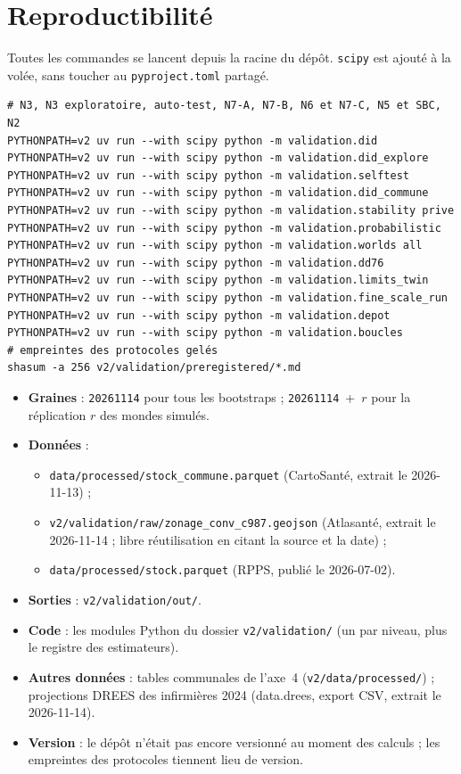\documentclass[11pt]{article}
\begin{document}
\section{Reproductibilité}\label{sec:repro}
Toutes les commandes se lancent depuis la racine du dépôt. \texttt{scipy} est ajouté à la volée,
sans toucher au \texttt{pyproject.toml} partagé.
\begin{verbatim}
# N3, N3 exploratoire, auto-test, N7-A, N7-B, N6 et N7-C, N5 et SBC, N2
PYTHONPATH=v2 uv run --with scipy python -m validation.did
PYTHONPATH=v2 uv run --with scipy python -m validation.did_explore
PYTHONPATH=v2 uv run --with scipy python -m validation.selftest
PYTHONPATH=v2 uv run --with scipy python -m validation.did_commune
PYTHONPATH=v2 uv run --with scipy python -m validation.stability prive
PYTHONPATH=v2 uv run --with scipy python -m validation.probabilistic
PYTHONPATH=v2 uv run --with scipy python -m validation.worlds all
PYTHONPATH=v2 uv run --with scipy python -m validation.dd76
PYTHONPATH=v2 uv run --with scipy python -m validation.limits_twin
PYTHONPATH=v2 uv run --with scipy python -m validation.fine_scale_run
PYTHONPATH=v2 uv run --with scipy python -m validation.depot
PYTHONPATH=v2 uv run --with scipy python -m validation.boucles
# empreintes des protocoles gelés
shasum -a 256 v2/validation/preregistered/*.md
\end{verbatim}
\begin{itemize}
  \item \textbf{Graines} : \texttt{20261114} pour tous les bootstraps ; \texttt{20261114}~+~$r$ pour
        la réplication $r$ des mondes simulés.
  \item \textbf{Données} :
        \begin{itemize}
          \item \texttt{data/processed/stock\_commune.parquet} (CartoSanté, extrait le 2026-11-13) ;
          \item \texttt{v2/validation/raw/zonage\_conv\_c987.geojson} (Atlasanté, extrait le
                2026-11-14 ; libre réutilisation en citant la source et la date) ;
          \item \texttt{data/processed/stock.parquet} (RPPS, publié le 2026-07-02).
        \end{itemize}
  \item \textbf{Sorties} : \texttt{v2/validation/out/}.
  \item \textbf{Code} : les modules Python du dossier \texttt{v2/validation/} (un par niveau,
        plus le registre des estimateurs).
  \item \textbf{Autres données} : tables communales de l'axe~4
        (\texttt{v2/data/processed/}) ; projections DREES des infirmières 2024 (data.drees, export
        CSV, extrait le 2026-11-14).
  \item \textbf{Version} : le dépôt n'était pas encore versionné au moment des calculs ; les
        empreintes des protocoles tiennent lieu de version.
\end{itemize}
\end{document}
